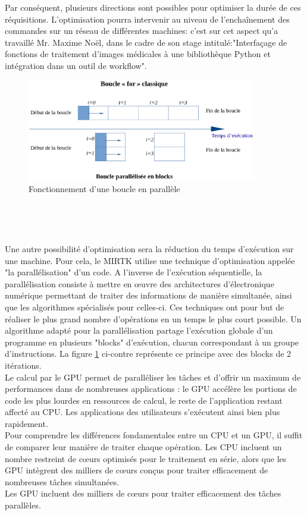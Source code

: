 \documentclass[10pt]{report}
\begin{document}
	Par conséquent, plusieurs directions sont possibles pour optimiser la durée de ces réquisitions. L'optimisation pourra intervenir au niveau de l'enchaînement des commandes sur un réseau de différentes machines: c'est sur cet aspect qu'a travaillé Mr. Maxime Noël, dans le cadre de son stage intitulé:"Interfaçage de fonctions de traitement d'images médicales à une bibliothèque Python et intégration dans un outil de workflow".\\
	\vspace{-0.7cm}
	\begin{figure}
		\includegraphics[width=10cm]{Reports/figures/gfor.eps}	
		\caption{Fonctionnement d'une boucle en parallèle}
		\label{Fonctionnement d'une boucle en parallèle}
	\end{figure}
	
	~\par~\par
	Une autre possibilité d'optimisation sera la réduction du temps d'exécution sur une machine. Pour cela, le MIRTK utilise une technique d'optimisation appelée "la parallélisation" d'un code. 
	A l'inverse de l'exécution séquentielle, la parallélisation consiste à mettre en œuvre des architectures d'électronique numérique permettant de traiter des informations de manière simultanée, ainsi que les algorithmes spécialisés pour celles-ci. Ces techniques ont pour but de réaliser le plus grand nombre d'opérations en un temps le plus court possible.
	Un algorithme adapté pour la parallélisation partage l'exécution globale d'un programme en plusieurs "blocks" d'exécution, chacun correspondant à un groupe d'instructions. La figure \ref{Fonctionnement d'une boucle en parallèle} ci-contre représente ce principe avec des blocks de 2 itérations.\\

	
	Le calcul par le GPU permet de paralléliser les tâches et d'offrir un maximum de performances dans de nombreuses applications : le GPU accélère les portions de code les plus lourdes en ressources de calcul, le reste de l'application restant affecté au CPU. Les applications des utilisateurs s'exécutent ainsi bien plus rapidement.\\
	Pour comprendre les différences fondamentales entre un CPU et un GPU, il suffit de comparer leur manière de traiter chaque opération. Les CPU incluent un nombre restreint de cœurs optimisés pour le traitement en série, alors que les GPU intègrent des milliers de cœurs conçus pour traiter efficacement de nombreuses tâches simultanées.\\
	Les GPU incluent des milliers de cœurs pour traiter efficacement des tâches parallèles. \\ 
	 
\end{document}
